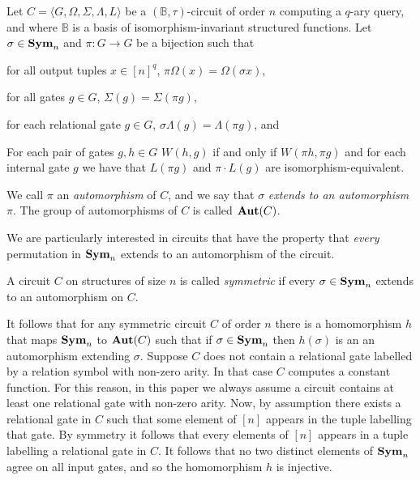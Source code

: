\documentclass[../paper.tex]{subfiles}
\begin{document}
\begin{definition}[Automorphism]\label{defn:automorphism}
  Let $C = \langle G, \Omega, \Sigma, \Lambda, L\rangle$ be a
  $(\mathbb{B},\tau)$-circuit of order $n$ computing a $q$-ary query, and where
  $\mathbb{B}$ is a basis of isomorphism-invariant structured functions. Let
  $\sigma \in \text{\textbf{Sym}}_n$ and $\pi: G \rightarrow G$ be a bijection such that
  \begin{myitemize}
  \item for all output tuples $x \in [n]^q$, $\pi \Omega (x) = \Omega (\sigma
    x)$,
  \item for all gates $g \in G$, $\Sigma (g) = \Sigma (\pi g)$,
  \item for each relational gate $g \in G$, $\sigma \Lambda (g) = \Lambda (\pi
    g)$, and
  \item For each pair of gates $g, h \in G$ $W(h,g)$ if and only if $W(\pi h,
    \pi g)$ and for each internal gate $g$ we have that $L(\pi g)$ and $ \pi
    \cdot L(g)$ are isomorphism-equivalent.
  \end{myitemize}
  We call $\pi$ an \emph{automorphism} of $C$, and we say that $\sigma$
  \emph{extends to an automorphism} $\pi$. The group of automorphisms of $C$ is
  called $\text{\textbf{Aut}} (C)$.
\end{definition}

We are particularly interested in circuits that have the property that
\emph{every} permutation in $\text{\textbf{Sym}}_n$ extends to an automorphism of the circuit.

\begin{definition}[Symmetry]
  A circuit $C$ on structures of size $n$ is called \emph{symmetric} if every
  $\sigma \in \text{\textbf{Sym}}_n$ extends to an automorphism on $C$.
\end{definition}

It follows that for any symmetric circuit $C$ of order $n$ there is a
homomorphism $h$ that maps $\text{\textbf{Sym}}_n$ to $\text{\textbf{Aut}}(C)$ such that if $\sigma \in
\text{\textbf{Sym}}_n$ then $h(\sigma)$ is an an automorphism extending $\sigma$.  Suppose $C$
does not contain a relational gate labelled by a relation symbol with non-zero
arity.  In that case $C$ computes a constant function.  For this reason, in this paper we
always assume a circuit contains at least one relational gate with non-zero
arity.  Now, by assumption there exists a relational gate in $C$ such that
some element of $[n]$ appears in the tuple labelling that gate.  By symmetry it
follows that every elements of $[n]$ appears in a tuple labelling a relational
gate in $C$. It follows that no two distinct elements of $\text{\textbf{Sym}}_n$ agree on all
input gates, and so the homomorphism $h$ is injective.
\end{document}

